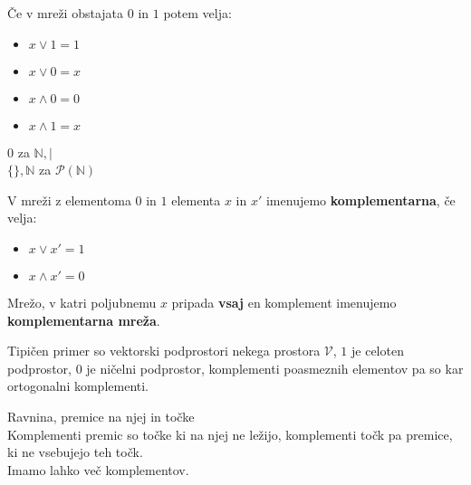 \documentclass[slovene]{beamer}
\begin{document}
\begin{frame}
\begin{block}{}
Če v mreži obstajata $0$ in $1$ potem velja:
\begin{itemize}
\item $x \lor 1 = 1$
\item $x \lor 0 = x$
\item $x \land 0 = 0$
\item $x \land 1 = x$
\end{itemize}
\end{block}

\pause
\begin{example}
$0$ za $\mathbb{N}, |$\\ $\{ \}, \mathbb{N}$ za $\mathcal{P}(\mathbb{N})$
\end{example}

\end{frame}

\begin{frame}
\begin{definition}
V mreži z elementoma $0$ in $1$ elementa $x$ in $x'$ imenujemo \textbf{komplementarna}, če velja:
\begin{itemize}
\item $x \lor x' = 1$
\item $x \land x' = 0$
\end{itemize}
\end{definition}

\begin{definition}
Mrežo, v katri poljubnemu $x$ pripada \textbf{vsaj} en komplement imenujemo \textbf{komplementarna mreža}.
\end{definition}

\end{frame}

\begin{frame}
\begin{example}
Tipičen primer so vektorski podprostori nekega prostora $\mathcal{V}$, $1$ je celoten podprostor, $0$ je ničelni podprostor, komplementi poasmeznih elementov pa so kar ortogonalni komplementi.
\end{example}

\begin{example}
Ravnina, premice na njej in točke\\
Komplementi premic so točke ki na njej ne ležijo, komplementi točk pa premice, ki ne vsebujejo teh točk.\\
Imamo lahko več komplementov.
\end{example}

\end{frame}
\end{document}
